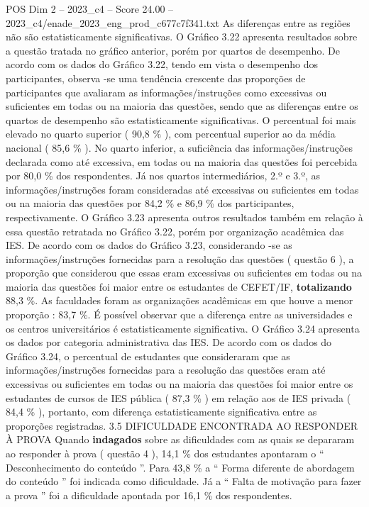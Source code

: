 \begin{textsample}{POS Dim 2 – 2023\_c4 – Score 24.00 – 2023\_c4/enade\_2023\_eng\_prod\_c677c7f341.txt}
As diferenças entre as regiões não são estatisticamente significativas.
O Gráfico 3.22 apresenta resultados sobre a questão tratada no gráfico anterior, porém por quartos de desempenho.
De acordo com os dados do Gráfico 3.22, tendo em vista o desempenho dos participantes, observa -se uma tendência crescente das proporções de participantes que avaliaram as informações/instruções como excessivas ou suficientes em todas ou na maioria das questões, sendo que as diferenças entre os quartos de desempenho são estatisticamente significativas.
O percentual foi mais elevado no quarto superior ( 90,8 \% ), com percentual superior ao da média nacional ( 85,6 \% ).
No quarto inferior, a suficiência das informações/instruções declarada como até excessiva, em todas ou na maioria das questões foi percebida por 80,0 \% dos respondentes.
Já nos quartos intermediários, 2.º e 3.º, as informações/instruções foram consideradas até excessivas ou suficientes em todas ou na maioria das questões por 84,2 \% e 86,9 \% dos participantes, respectivamente.
O Gráfico 3.23 apresenta outros resultados também em relação à essa questão retratada no Gráfico 3.22, porém por organização acadêmica das IES.
De acordo com os dados do Gráfico 3.23, considerando -se as informações/instruções fornecidas para a resolução das questões ( questão 6 ), a proporção que considerou que essas eram excessivas ou suficientes em todas ou na maioria das questões foi maior entre os estudantes de CEFET/IF, \textbf{totalizando} 88,3 \%.
As faculdades foram as organizações acadêmicas em que houve a menor proporção : 83,7 \%.
É possível observar que a diferença entre as universidades e os centros universitários é estatisticamente significativa.
O Gráfico 3.24 apresenta os dados por categoria administrativa das IES.
De acordo com os dados do Gráfico 3.24, o percentual de estudantes que consideraram que as informações/instruções fornecidas para a resolução das questões eram até excessivas ou suficientes em todas ou na maioria das questões foi maior entre os estudantes de cursos de IES pública ( 87,3 \% ) em relação aos de IES privada ( 84,4 \% ), portanto, com diferença estatisticamente significativa entre as proporções registradas. 3.5 DIFICULDADE ENCONTRADA AO RESPONDER À PROVA Quando \textbf{indagados} sobre as dificuldades com as quais se depararam ao responder à prova ( questão 4 ), 14,1 \% dos estudantes apontaram o “ Desconhecimento do conteúdo ”.
Para 43,8 \% a “ Forma diferente de abordagem do conteúdo ” foi indicada como dificuldade.
Já a “ Falta de motivação para fazer a prova ” foi a dificuldade apontada por 16,1 \% dos respondentes.

\end{textsample}
